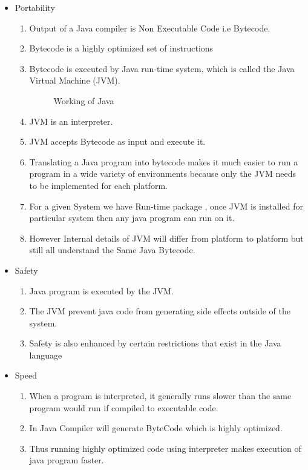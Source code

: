 \documentclass{SureshLimkar}
\begin{document}
\begin{itemize}
	\item Portability
	\begin{enumerate}
		\item Output of a Java compiler is Non Executable Code i.e Bytecode.
	  \item	Bytecode is a highly optimized set of instructions
		\item Bytecode is executed by Java run-time system, which is called the Java Virtual Machine (JVM).
\begin{figure}[h]%
\centering
{}%
\caption{Working of Java}%
\label{Working of Java}%
\end{figure}
	
		\item JVM is an interpreter.
		\item JVM accepts Bytecode as input and execute it.
		\item Translating a Java program into bytecode makes it much easier to run a program in a wide variety of environments because only the JVM needs to be implemented for each platform.
		\item For a given System we have Run-time package , once JVM is installed for particular system then any java program can run on it.
		\item However Internal details of  JVM will differ from platform to platform but still all understand the Same Java Bytecode.
	\end{enumerate}
	\item Safety
	\begin{enumerate}
		\item Java program is executed by the JVM.
		\item The JVM prevent java code from generating side effects outside of the system.
		\item Safety is also enhanced by certain restrictions that exist in the Java language
	\end{enumerate}
	\item Speed
	\begin{enumerate}
		\item When a program is interpreted, it generally runs slower than the same program would run if compiled to executable code.
		\item In Java Compiler will generate ByteCode which is highly optimized.
		\item Thus running highly optimized code using interpreter makes execution of java program faster.
	\end{enumerate}
\end{itemize}
\newpage
\end{document}

